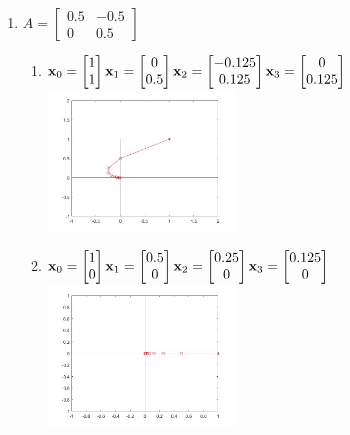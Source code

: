 \documentclass{article}
\newcommand{\newVec}[2]{\begin{bmatrix}#1 \\ #2 \end{bmatrix}}
\newcommand{\newtt}[4]{\begin{bmatrix}#1 & #2\\ #3 & #4 \end{bmatrix}}
\begin{document}
\begin{enumerate}
\item
$A = \newtt{0.5}{-0.5}{0}{0.5}$
\begin{enumerate}
    \item {$\textbf{x}_0 = \newVec{1}{1}\\ \textbf{x}_1 = \newVec{0}{0.5}\\ \textbf{x}_2 = \newVec{-0.125}{0.125}\\ \textbf{x}_3 = \newVec{0}{0.125}$\\
        \includegraphics[width=50mm,scale=1]{Matlab1.jpg}
    }
    \item $\textbf{x}_0 = \newVec{1}{0}\\ \textbf{x}_1 = \newVec{0.5}{0}\\ \textbf{x}_2 = \newVec{0.25}{0}\\ \textbf{x}_3 = \newVec{0.125}{0}$\\
    \includegraphics[width=50mm,scale=1]{Matlab2.jpg}


\end{enumerate}
\end{enumerate}
\end{document}
